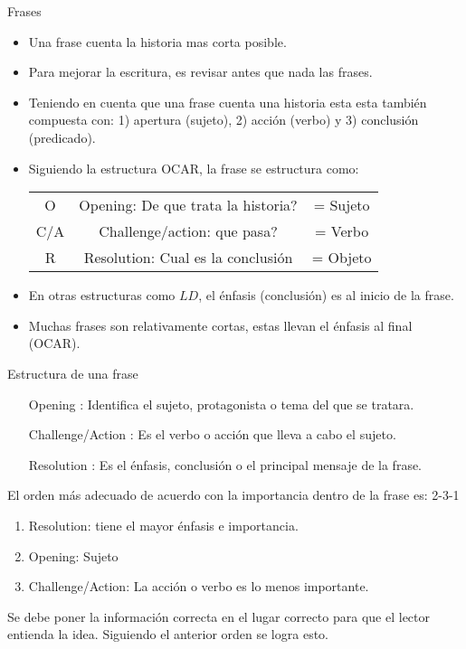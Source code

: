 \documentclass[
10pt,
aspectratio=169,
]{beamer}
\begin{document}
\begin{frame}[c]{Frases}
\begin{itemize}
\item Una frase cuenta la historia mas corta posible.
\item Para mejorar la escritura, es revisar antes que nada las frases. 
\item Teniendo en cuenta que una frase cuenta una historia esta esta tambi\'en compuesta con: 1) apertura (sujeto), 2) acci\'on (verbo) y 3) conclusi\'on (predicado).
\item Siguiendo la estructura \alert{OCAR}, la frase se estructura como:
\begin{center}
\begin{tabular}{ c c c }
 O & Opening: De que trata la historia? & = Sujeto \\ 
 C/A & Challenge/action: que pasa? & = Verbo \\  
 R & Resolution: Cual es la conclusi\'on & = Objeto    
\end{tabular}
\end{center}
\item En otras estructuras como $LD$, el \'enfasis (conclusi\'on) es al inicio de la frase. 
\item Muchas frases son relativamente cortas, estas llevan el \'enfasis al final (\alert{OCAR}).  
\end{itemize}
\end{frame}

\begin{frame}[c]{Estructura de una frase}
\begin{center}
\begin{minipage}{0.8\linewidth}
\begin{itemize}
\item[\alert{O}pening]: Identifica el sujeto, protagonista o tema del que se tratara. 
\item [\alert{C}hallenge/\alert{A}ction]: Es el verbo o acci\'on que lleva a cabo el sujeto. 
\item[\alert{R}esolution]: Es el \'enfasis, conclusi\'on o el principal mensaje de la frase.
\end{itemize}
\end{minipage}
\end{center}
\noindent El orden m\'as adecuado de acuerdo con la importancia dentro de la frase es: \alert{2-3-1} 
\begin{enumerate}
\item \alert{R}esolution: tiene el mayor \'enfasis e importancia.
\item \alert{O}pening: Sujeto
\item \alert{C}hallenge/\alert{A}ction: La acci\'on o verbo es lo menos importante. 
\end{enumerate}
Se debe poner la informaci\'on correcta en el lugar correcto para que el lector entienda la idea. Siguiendo el anterior orden se logra esto.
\end{frame}
\end{document}
